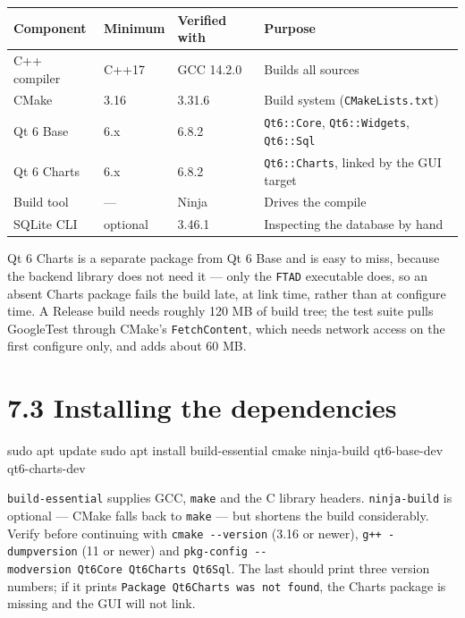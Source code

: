 \documentclass[
  12pt,
]{report}
\newenvironment{Shaded}{}{}
\newcommand{\FunctionTok}[1]{\textcolor[rgb]{0.02,0.16,0.49}{#1}}
\newcommand{\NormalTok}[1]{#1}
\begin{document}
\begin{longtable}[]{@{}llll@{}}
\toprule\noalign{}
Component & Minimum & Verified with & Purpose \\
\midrule\noalign{}
\endhead
\bottomrule\noalign{}
\endlastfoot
C++ compiler & C++17 & GCC 14.2.0 & Builds all sources \\
CMake & 3.16 & 3.31.6 & Build system (\texttt{CMakeLists.txt}) \\
Qt 6 Base & 6.x & 6.8.2 & \texttt{Qt6::Core}, \texttt{Qt6::Widgets},
\texttt{Qt6::Sql} \\
Qt 6 Charts & 6.x & 6.8.2 & \texttt{Qt6::Charts}, linked by the GUI
target \\
Build tool & --- & Ninja & Drives the compile \\
SQLite CLI & optional & 3.46.1 & Inspecting the database by hand \\
\end{longtable}

Qt 6 Charts is a separate package from Qt 6 Base and is easy to miss,
because the backend library does not need it --- only the \texttt{FTAD}
executable does, so an absent Charts package fails the build late, at
link time, rather than at configure time. A Release build needs roughly
120 MB of build tree; the test suite pulls GoogleTest through CMake's
\texttt{FetchContent}, which needs network access on the first configure
only, and adds about 60 MB.

\section{7.3 Installing the
dependencies}\label{installing-the-dependencies}

\begin{Shaded}
\begin{Highlighting}[]
\FunctionTok{sudo}\NormalTok{ apt update}
\FunctionTok{sudo}\NormalTok{ apt install build{-}essential cmake ninja{-}build qt6{-}base{-}dev qt6{-}charts{-}dev}
\end{Highlighting}
\end{Shaded}

\texttt{build-essential} supplies GCC, \texttt{make} and the C library
headers. \texttt{ninja-build} is optional --- CMake falls back to
\texttt{make} --- but shortens the build considerably. Verify before
continuing with \texttt{cmake\ -\/\allowbreak{}-version} (3.16 or newer),
\texttt{g++\ -dumpversion} (11 or newer) and
\texttt{pkg-config\ -\/\allowbreak{}-modversion\ Qt6Core\ Qt6Charts\ Qt6Sql}. The
last should print three version numbers; if it prints
\texttt{Package\ Qt6Charts\ was\ not\ found}, the Charts package is
missing and the GUI will not link.
\end{document}
